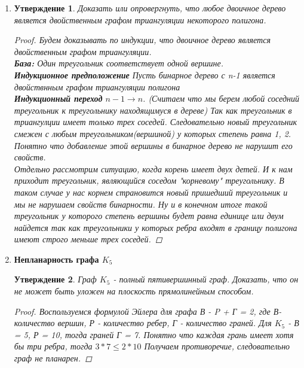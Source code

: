 \documentclass{article}
\theoremstyle{plain}
\newtheorem{statement}{Утверждение}[section]
\theoremstyle{definition}
\begin{document}
\begin{enumerate}
\item \begin{statement} Доказать или опровергнуть, что любое двоичное дерево является двойственным графом триангуляции некоторого полигона. 
\begin{proof} 
Будем доказывать по индукции, что двоичное дерево является двойственным графом триангуляции. \\
\textbf{База:} Один треугольник соответствует одной вершине. \\
\textbf{Индукционное предположение} Пусть бинарное дерево с n-1 является двойствнным графом триангуляции полигона \\
\textbf{Индукционный переход} $n-1 \rightarrow n$. (Считаем что мы берем любой соседний треугольник к треугольнику находящимуся в дереве)
Так как треугольник в триангулции имеет только трех соседей. Следовательно новый треугольник смежен с любым треугольником(вершиной) у которых степень равна 1, 2. Понятно что добавление этой вершины в бинарное дерево не нарушит его свойств. \\ 
Отдельно рассмотрим ситуацию, когда корень имеет двух детей. И к нам приходит треугольник, являющийся соседом "корневому" треугольнику. 
В таком случае у нас корнем страновится новый пришедший треугольник и мы не нарушаем свойств бинарности. Ну и в конечном итоге такой треугольник у которого степень вершины будет равна единице или двум найдется так как треугольники у которых ребра входят в границу полигона имеют строго меньше трех соседей.
\end{proof}
\end{statement}

\item \textbf{ Непланарность графа $K_5$} 
\begin{statement} Граф $K_5$ - полный пятивершинный граф. Доказать, что он не может быть уложен на плоскость прямолинейным способом.  
\begin{proof} 
Воспользуемся формулой Эйлера для графа В - P + Г = 2, где В-количество вершин, Р - количество ребер, Г - количество граней. 
Для $K_5$ - В = 5, Р = 10, тогда граней Г = 7. 
Понятно что каждая грань имеет хотя бы три ребра, тогда $3*7 \leq 2*10$
Получаем противоречие, следовательно граф не планарен.
\end{proof}
\end{statement}


\end{enumerate}
\end{document}
